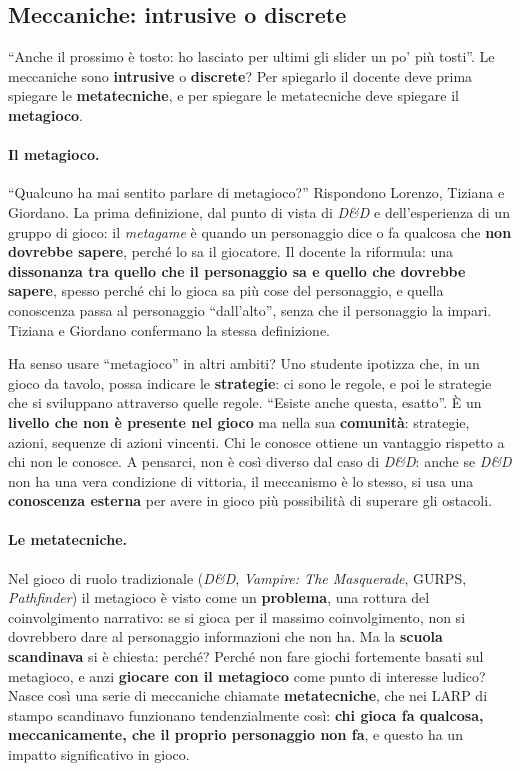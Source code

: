 \subsection{Meccaniche: intrusive o discrete}
\label{a3:sec:intrusive}

``Anche il prossimo è tosto: ho lasciato per ultimi gli slider un po' più
tosti''. Le meccaniche sono \textbf{intrusive} o \textbf{discrete}? Per spiegarlo
il docente deve prima spiegare le \textbf{metatecniche}, e per spiegare le
metatecniche deve spiegare il \textbf{metagioco}.

\paragraph{Il metagioco.} ``Qualcuno ha mai sentito parlare di metagioco?''
Rispondono Lorenzo, Tiziana e Giordano. La prima definizione, dal punto di vista
di \emph{D\&D} e dell'esperienza di un gruppo di gioco: il \emph{metagame} è
quando un personaggio dice o fa qualcosa che \textbf{non dovrebbe sapere}, perché
lo sa il giocatore. Il docente la riformula: una \textbf{dissonanza tra quello
che il personaggio sa e quello che dovrebbe sapere}, spesso perché chi lo gioca sa
più cose del personaggio, e quella conoscenza passa al personaggio ``dall'alto'',
senza che il personaggio la impari. Tiziana e Giordano confermano la stessa
definizione.

Ha senso usare ``metagioco'' in altri ambiti? Uno studente ipotizza che, in un
gioco da tavolo, possa indicare le \textbf{strategie}: ci sono le regole, e poi
le strategie che si sviluppano attraverso quelle regole. ``Esiste anche questa,
esatto''. È un \textbf{livello che non è presente nel gioco} ma nella sua
\textbf{comunità}: strategie, azioni, sequenze di azioni vincenti. Chi le conosce
ottiene un vantaggio rispetto a chi non le conosce. A pensarci, non è così
diverso dal caso di \emph{D\&D}: anche se \emph{D\&D} non ha una vera condizione
di vittoria, il meccanismo è lo stesso, si usa una \textbf{conoscenza esterna}
per avere in gioco più possibilità di superare gli ostacoli.

\paragraph{Le metatecniche.} Nel gioco di ruolo tradizionale (\emph{D\&D},
\emph{Vampire: The Masquerade}, GURPS, \emph{Pathfinder}) il metagioco è visto
come un \textbf{problema}, una rottura del coinvolgimento narrativo: se si gioca
per il massimo coinvolgimento, non si dovrebbero dare al personaggio informazioni
che non ha. Ma la \textbf{scuola scandinava} si è chiesta: perché? Perché non
fare giochi fortemente basati sul metagioco, e anzi \textbf{giocare con il
metagioco} come punto di interesse ludico? Nasce così una serie di meccaniche
chiamate \textbf{metatecniche}, che nei LARP di stampo scandinavo funzionano
tendenzialmente così: \textbf{chi gioca fa qualcosa, meccanicamente, che il
proprio personaggio non fa}, e questo ha un impatto significativo in gioco.

